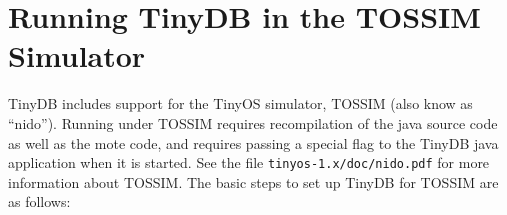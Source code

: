 \documentclass[11pt]{article}
\newcommand{\docroot}{tinyos-1.x}
\begin{document}


\section{Running TinyDB in the TOSSIM Simulator}\label{sec:tossim}

TinyDB includes support for the TinyOS simulator, TOSSIM (also know as
``nido'').  Running under TOSSIM requires recompilation of the java
source code as well as the mote code, and requires passing a special
flag to the TinyDB java application when it is started.  See the file
{\tt \docroot/doc/nido.pdf} for more information about TOSSIM.  The
basic steps to set up TinyDB for TOSSIM are as follows:
\end{document}
